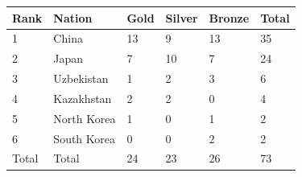 \documentclass{article}
\begin{document}
\begin{tabular}{llllll}
\toprule
Rank & Nation & Gold & Silver & Bronze & Total \\
\midrule
1 & China & 13 & 9 & 13 & 35 \\
2 & Japan & 7 & 10 & 7 & 24 \\
3 & Uzbekistan & 1 & 2 & 3 & 6 \\
4 & Kazakhstan & 2 & 2 & 0 & 4 \\
5 & North Korea & 1 & 0 & 1 & 2 \\
6 & South Korea & 0 & 0 & 2 & 2 \\
Total & Total & 24 & 23 & 26 & 73 \\
\bottomrule
\end{tabular}
\end{document}
